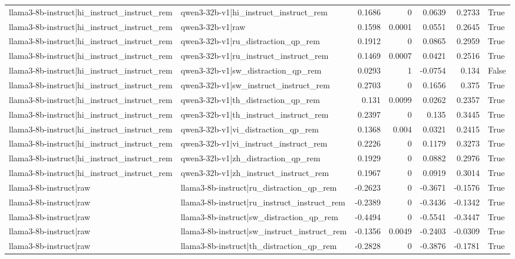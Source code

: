 \begin{table}
\begin{tabular}{l l r r r r l}
llama3-8b-instruct|hi_instruct_instruct_rem & qwen3-32b-v1|hi_instruct_instruct_rem & 0.1686 & 0 & 0.0639 & 0.2733 & True \\
llama3-8b-instruct|hi_instruct_instruct_rem & qwen3-32b-v1|raw & 0.1598 & 0.0001 & 0.0551 & 0.2645 & True \\
llama3-8b-instruct|hi_instruct_instruct_rem & qwen3-32b-v1|ru_distraction_qp_rem & 0.1912 & 0 & 0.0865 & 0.2959 & True \\
llama3-8b-instruct|hi_instruct_instruct_rem & qwen3-32b-v1|ru_instruct_instruct_rem & 0.1469 & 0.0007 & 0.0421 & 0.2516 & True \\
llama3-8b-instruct|hi_instruct_instruct_rem & qwen3-32b-v1|sw_distraction_qp_rem & 0.0293 & 1 & -0.0754 & 0.134 & False \\
llama3-8b-instruct|hi_instruct_instruct_rem & qwen3-32b-v1|sw_instruct_instruct_rem & 0.2703 & 0 & 0.1656 & 0.375 & True \\
llama3-8b-instruct|hi_instruct_instruct_rem & qwen3-32b-v1|th_distraction_qp_rem & 0.131 & 0.0099 & 0.0262 & 0.2357 & True \\
llama3-8b-instruct|hi_instruct_instruct_rem & qwen3-32b-v1|th_instruct_instruct_rem & 0.2397 & 0 & 0.135 & 0.3445 & True \\
llama3-8b-instruct|hi_instruct_instruct_rem & qwen3-32b-v1|vi_distraction_qp_rem & 0.1368 & 0.004 & 0.0321 & 0.2415 & True \\
llama3-8b-instruct|hi_instruct_instruct_rem & qwen3-32b-v1|vi_instruct_instruct_rem & 0.2226 & 0 & 0.1179 & 0.3273 & True \\
llama3-8b-instruct|hi_instruct_instruct_rem & qwen3-32b-v1|zh_distraction_qp_rem & 0.1929 & 0 & 0.0882 & 0.2976 & True \\
llama3-8b-instruct|hi_instruct_instruct_rem & qwen3-32b-v1|zh_instruct_instruct_rem & 0.1967 & 0 & 0.0919 & 0.3014 & True \\
llama3-8b-instruct|raw & llama3-8b-instruct|ru_distraction_qp_rem & -0.2623 & 0 & -0.3671 & -0.1576 & True \\
llama3-8b-instruct|raw & llama3-8b-instruct|ru_instruct_instruct_rem & -0.2389 & 0 & -0.3436 & -0.1342 & True \\
llama3-8b-instruct|raw & llama3-8b-instruct|sw_distraction_qp_rem & -0.4494 & 0 & -0.5541 & -0.3447 & True \\
llama3-8b-instruct|raw & llama3-8b-instruct|sw_instruct_instruct_rem & -0.1356 & 0.0049 & -0.2403 & -0.0309 & True \\
llama3-8b-instruct|raw & llama3-8b-instruct|th_distraction_qp_rem & -0.2828 & 0 & -0.3876 & -0.1781 & True \\

\end{tabular}
\end{table}
